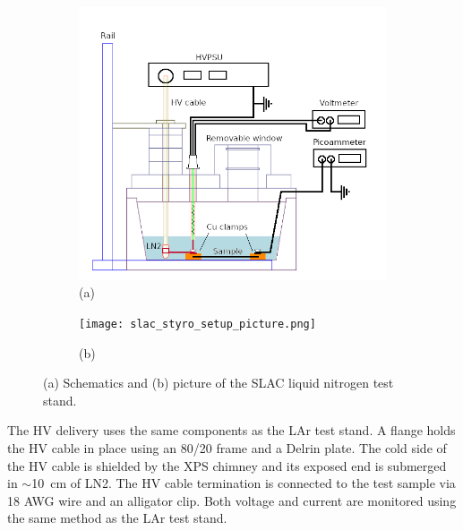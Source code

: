 \documentclass[a4paper,12pt]{article}
\begin{document}
\begin{figure}[htb]
\centering
\begin{subfigure}[c]{0.49\linewidth}
	\begin{center}
		\includegraphics[width=\linewidth]{slac_styro_setup.png}
		(a)
	\end{center}
\end{subfigure}
\begin{subfigure}[c]{0.49\linewidth}
	\begin{center}
		\vspace*{1em}
		
		\texttt{[image: slac\_styro\_setup\_picture.png]}
		\vspace*{0.5em}
		
		(b)
	\end{center}
\end{subfigure}
\caption{(a) Schematics and (b) picture of the SLAC liquid nitrogen test stand.}
\label{fig:slac_styro_setup}
\end{figure}


The HV delivery uses the same components as the LAr test stand.  
A flange holds the HV cable in place using an 80/20 frame and a Delrin plate. 
The cold side of the HV cable is shielded by the XPS chimney and its exposed end is submerged in $\sim$\SI{10}{\centi\meter} of LN2. 
The HV cable termination is connected to the test sample via 18 AWG wire and an alligator clip.
Both voltage and current are monitored using the same method as the LAr test stand. 
\end{document}
